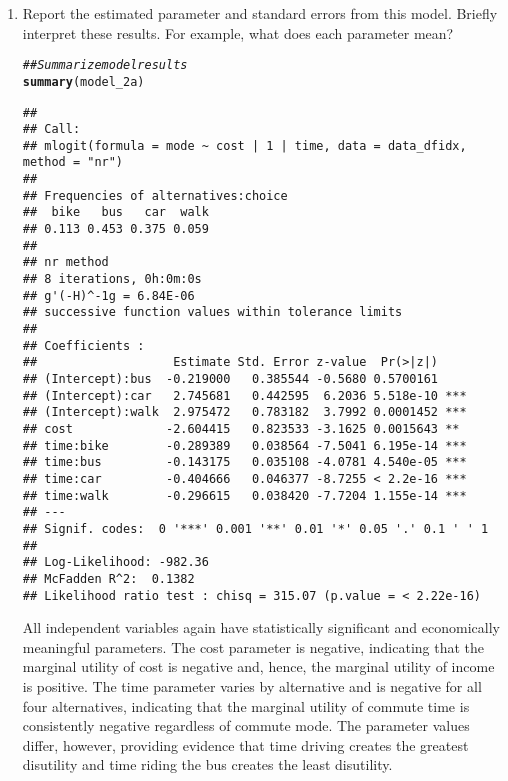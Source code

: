 \documentclass[11pt,letterpaper]{article}\usepackage[]{graphicx}\usepackage[]{xcolor}
\makeatletter
\newcommand{\hlcom}[1]{\textcolor[rgb]{0.678,0.584,0.686}{\textit{#1}}}%
\newcommand{\hlstd}[1]{\textcolor[rgb]{0.345,0.345,0.345}{#1}}%
\newcommand{\hlkwd}[1]{\textcolor[rgb]{0.737,0.353,0.396}{\textbf{#1}}}%
\newenvironment{kframe}{%
 \def\at@end@of@kframe{}%
 \ifinner\ifhmode%
  \def\at@end@of@kframe{\end{minipage}}%
  \begin{minipage}{\columnwidth}%
 \fi\fi%
 \def\FrameCommand##1{\hskip\@totalleftmargin \hskip-\fboxsep
 \colorbox{shadecolor}{##1}\hskip-\fboxsep
     \hskip-\linewidth \hskip-\@totalleftmargin \hskip\columnwidth}%
 \MakeFramed {\advance\hsize-\width
   \@totalleftmargin\z@ \linewidth\hsize
   \@setminipage}}%
 {\par\unskip\endMakeFramed%
 \at@end@of@kframe}
\newenvironment{knitrout}{}{} %
\makeatother
\begin{document}
\begin{enumerate}[label=\alph*., leftmargin=*]
	\begin{enumerate}[label=\roman*.]
		\item Report the estimated parameter and standard errors from this model. Briefly interpret these results. For example, what does each parameter mean?

\begin{knitrout}
\color{fgcolor}\begin{kframe}
\begin{alltt}
\hlcom{## Summarize model results}
\hlkwd{summary}\hlstd{(model_2a)}
\end{alltt}
\begin{verbatim}
## 
## Call:
## mlogit(formula = mode ~ cost | 1 | time, data = data_dfidx, method = "nr")
## 
## Frequencies of alternatives:choice
##  bike   bus   car  walk 
## 0.113 0.453 0.375 0.059 
## 
## nr method
## 8 iterations, 0h:0m:0s 
## g'(-H)^-1g = 6.84E-06 
## successive function values within tolerance limits 
## 
## Coefficients :
##                   Estimate Std. Error z-value  Pr(>|z|)    
## (Intercept):bus  -0.219000   0.385544 -0.5680 0.5700161    
## (Intercept):car   2.745681   0.442595  6.2036 5.518e-10 ***
## (Intercept):walk  2.975472   0.783182  3.7992 0.0001452 ***
## cost             -2.604415   0.823533 -3.1625 0.0015643 ** 
## time:bike        -0.289389   0.038564 -7.5041 6.195e-14 ***
## time:bus         -0.143175   0.035108 -4.0781 4.540e-05 ***
## time:car         -0.404666   0.046377 -8.7255 < 2.2e-16 ***
## time:walk        -0.296615   0.038420 -7.7204 1.155e-14 ***
## ---
## Signif. codes:  0 '***' 0.001 '**' 0.01 '*' 0.05 '.' 0.1 ' ' 1
## 
## Log-Likelihood: -982.36
## McFadden R^2:  0.1382 
## Likelihood ratio test : chisq = 315.07 (p.value = < 2.22e-16)
\end{verbatim}
\end{kframe}
\end{knitrout}

		All independent variables again have statistically significant and economically meaningful parameters. The cost parameter is negative, indicating that the marginal utility of cost is negative and, hence, the marginal utility of income is positive. The time parameter varies by alternative and is negative for all four alternatives, indicating that the marginal utility of commute time is consistently negative regardless of commute mode. The parameter values differ, however, providing evidence that time driving creates the greatest disutility and time riding the bus creates the least disutility.


\end{enumerate}
\end{enumerate}
\end{document}
